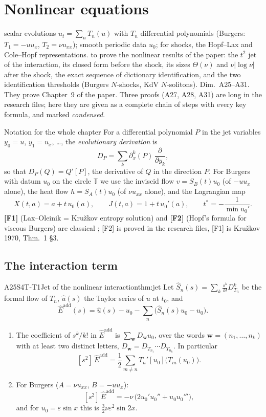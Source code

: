 \chapter{Nonlinear equations}\label{ch:cI4}
\chapterbrief
{scalar evolutions $u_t=\sum_nT_n(u)$ with $T_n$ differential polynomials (Burgers: $T_1=-uu_x$, $T_2=\nu u_{xx}$); smooth periodic data $u_0$; for shocks, the Hopf--Lax and Cole--Hopf representations.}
{to prove the nonlinear results of the paper: the $t^2$ jet of the interaction, its closed form before the shock, its sizes $\Theta(\nu)$ and $\nu|\log\nu|$ after the shock, the exact sequence of dictionary identification, and the two identification thresholds (Burgers $N$-shocks, KdV $N$-solitons).}
{Dim.~A25--A31. They prove Chapter~9 of the paper. Three proofs (A27, A28, A31) are long in the research files; here they are given as a complete chain of steps with every key formula, and marked \emph{condensed}.}

\begin{notebox}{Notation for the whole chapter}
For a differential polynomial $P$ in the jet variables $y_0=u$, $y_1=u_x$, \dots, the \emph{evolutionary derivation} is
\[
D_P=\sum_k\partial_x^k(P)\,\frac{\partial}{\partial y_k},
\]
so that $D_P(Q)=Q'[P]$, the derivative of $Q$ in the direction $P$. For Burgers with datum $u_0$ on the circle $\mathbb T$ we use the inviscid flow $v=S_B(t)u_0$ (of $-uu_x$ alone), the heat flow $h=S_A(t)u_0$ (of $\nu u_{xx}$ alone), and the Lagrangian map
\[
X(t,a)=a+t\,u_0(a),\qquad J(t,a)=1+t\,u_0'(a),\qquad t^*=-\frac{1}{\min u_0'} .
\]
\textbf{[F1]} (Lax--Oleinik = Kru\v zkov entropy solution) and \textbf{[F2]} (Hopf's formula for viscous Burgers) are classical \cf; [F2] is proved in the research files, [F1] is Kru\v zkov 1970, Thm.~1 \S3.
\end{notebox}

\section{The interaction term}

\begin{dimcard}{A25}{S4T-T1}{Jet of the nonlinear interaction}{\proved}{thm:jet}
Let $\hat S_n(s)=\sum_k\frac{s^k}{k!}D_{T_n}^k$ be the formal flow of $T_n$, $\hat u(s)$ the Taylor series of $u$ at $t_0$, and
\[
\hat E^{\mathrm{add}}(s)=\hat u(s)-u_0-\sum_n\big(\hat S_n(s)u_0-u_0\big).
\]
\begin{enumerate}[label=(\roman*)]
\item The coefficient of $s^k/k!$ in $\hat E^{\mathrm{add}}$ is $\sum_{\mathbf w}D_{\mathbf w}u_0$, over the words $\mathbf w=(n_1,\dots,n_k)$ with at least two distinct letters, $D_{\mathbf w}=D_{T_{n_1}}\cdots D_{T_{n_k}}$. In particular
\[
[s^2]\,\hat E^{\mathrm{add}}=\frac12\sum_{m\ne n}T_n'[u_0]\big(T_m(u_0)\big).
\]
\item For Burgers ($A=\nu u_{xx}$, $B=-uu_x$):
\[
[s^2]\,\hat E^{\mathrm{add}}=-\nu\,\big(2u_0'u_0''+u_0u_0'''\big),
\]
and for $u_0=\varepsilon\sin x$ this is $\tfrac32\nu\varepsilon^2\sin2x$.
\end{enumerate}
\end{dimcard}


